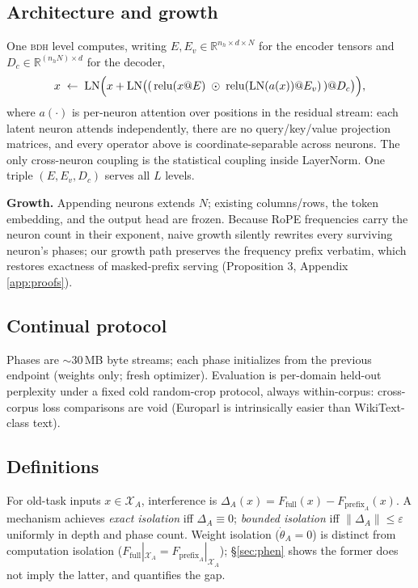 \documentclass[11pt]{article}
\theoremstyle{remark}\newtheorem{remark}{Remark}
\newcommand{\BDH}{\textsc{bdh}}
\begin{document}
\subsection{Architecture and growth}

One \BDH{} level computes, writing $E,E_v\in\mathbb{R}^{n_h\times d\times N}$ for the encoder
tensors and $D_c\in\mathbb{R}^{(n_h N)\times d}$ for the decoder,
\[
x \;\leftarrow\; \operatorname{LN}\Bigl(x + \operatorname{LN}\bigl(
(\,\operatorname{relu}(x@E)\;\odot\;\operatorname{relu}(\operatorname{LN}(a(x))@E_v)\,) @ D_c
\bigr)\Bigr),
\]
where $a(\cdot)$ is per-neuron attention over positions in the residual stream: each latent
neuron attends independently, there are no query/key/value projection matrices, and every
operator above is coordinate-separable across neurons. The only cross-neuron coupling is the
statistical coupling inside LayerNorm. One triple $(E,E_v,D_c)$ serves all $L$ levels.

\textbf{Growth.} Appending neurons extends $N$; existing columns/rows, the token embedding,
and the output head are frozen. Because RoPE frequencies carry the neuron count in their
exponent, naive growth silently rewrites every surviving neuron's phases; our growth path
preserves the frequency prefix verbatim, which restores exactness of masked-prefix serving (Proposition 3, Appendix \ref{app:proofs}).

\subsection{Continual protocol}
Phases are ${\sim}30$\,MB byte streams; each phase initializes from the previous endpoint
(weights only; fresh optimizer). Evaluation is per-domain held-out perplexity under a fixed
cold random-crop protocol, always within-corpus: cross-corpus loss comparisons are void
(Europarl is intrinsically easier than WikiText-class text).

\subsection{Definitions}
For old-task inputs $x\in\mathcal{X}_A$, interference is
$\Delta_A(x) = F_{\mathrm{full}}(x) - F_{\mathrm{prefix}_A}(x)$.
A mechanism achieves \emph{exact isolation} iff $\Delta_A \equiv 0$;
\emph{bounded isolation} iff $\lVert\Delta_A\rVert \le \varepsilon$ uniformly in depth and
phase count. Weight isolation ($\dot\theta_A = 0$) is distinct from computation isolation
($F_{\mathrm{full}}|_{\mathcal{X}_A} = F_{\mathrm{prefix}_A}|_{\mathcal{X}_A}$); \S\ref{sec:phen}
shows the former does not imply the latter, and quantifies the gap.
\end{document}
